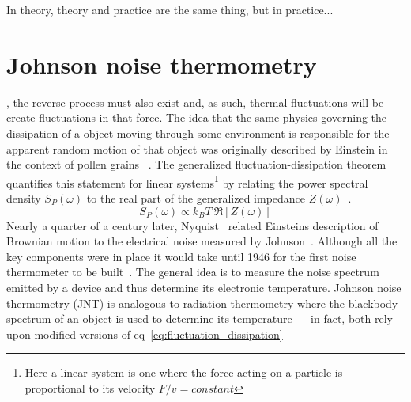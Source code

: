 \begin{savequote}[75mm]
In theory, theory and practice are the same thing, but in practice...
\end{savequote}

\chapter{Johnson noise thermometry}
\label{ch:johnson_noise_thermometry}

, the reverse process must also exist and, as such, thermal fluctuations will be create fluctuations in that force. The idea that the same physics governing the dissipation of a object moving through some environment is responsible for the apparent random motion of that object was originally described by Einstein in the context of pollen grains ~\cite{einstein_investigations_2011}. The generalized fluctuation-dissipation theorem~\cite{kubo_fluctuation-dissipation_1966} quantifies this statement for linear systems\footnote{Here a linear system is one where the force acting on a particle is proportional to its velocity $F/v = constant$} by relating the power spectral density $S_P(\omega)$ to the real part of the generalized impedance $Z(\omega)$~\cite{callen_irreversibility_1951}.
\begin{equation}\label{eq:fluctuation_dissipation}
S_P(\omega) \propto k_BT\ \Re[Z(\omega)]
\end{equation}
Nearly a quarter of a century later, Nyquist~\cite{nyquist_thermal_1928} related Einsteins description of Brownian motion to the electrical noise measured by Johnson~\cite{johnson_thermal_1927,johnson_thermal_1928}. Although all the key components were in place it would take until 1946 for the first noise thermometer to be built~\cite{dicke_measurement_1946}. The general idea is to measure the noise spectrum emitted by a device and thus determine its electronic temperature. Johnson noise thermometry (JNT) is analogous to radiation thermometry where the blackbody spectrum of an object is used to determine its temperature --- in fact, both rely upon modified versions of eq~\ref{eq:fluctuation_dissipation}

